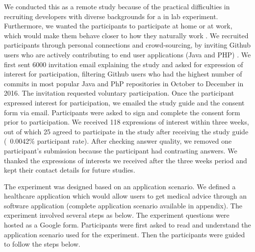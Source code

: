 \documentclass{sigchi}
\begin{document}
We conducted this as a remote study because of the practical difficulties in recruiting developers with diverse backgrounds for a in lab experiment. Furthermore, we wanted the participants to participate at home or at work, which would make them behave closer to how they naturally work \cite {wermke2017security, acar2017comparing}. We recruited participants through personal connections and crowd-sourcing, by inviting Github users who are actively contributing to end user applications (Java and PHP) \cite {wermke2017security}. We first sent 6000 invitation email explaining the study and asked for expression of interest for participation, filtering Github users who had the highest number of commits in most popular Java and PhP repositories in October to December in 2016. The invitation requested voluntary participation. Once the participant expressed interest for participation, we emailed the study guide and the consent form via email. Participants were asked to sign and complete the consent form prior to participation. We received 118 expressions of interest within three weeks, out of which 25 agreed to participate in the study after receiving the study guide (~0.0042\% participant rate). After checking answer quality, we removed one participant's submission because the participant had contrasting answers. We thanked the expressions of interests we received after the three weeks period and kept their contact details for future studies.

The experiment was designed based on an application scenario. We defined a healthcare application which would allow users to get medical advice through an software application (complete application scenario available in appendix). The experiment involved several steps as below. The experiment questions were hosted as a Google form. Participants were first asked to read and understand the application scenario used for the experiment. Then the participants were guided to follow the steps below.
\end{document}
